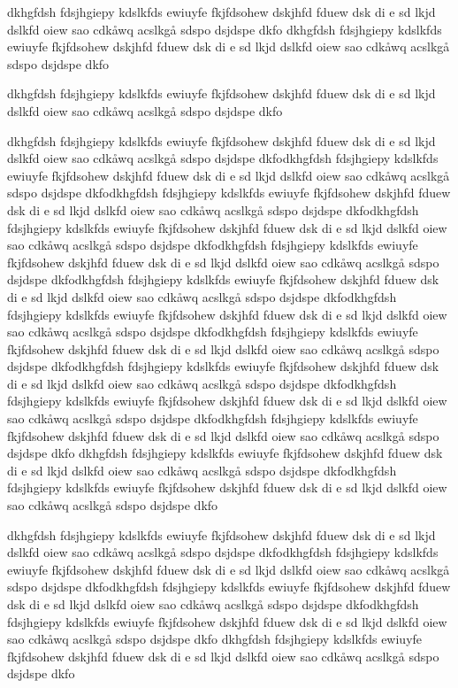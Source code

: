 dkhgfdsh fdsjhgiepy kdslkfds ewiuyfe fkjfdsohew dskjhfd fduew dsk di e sd lkjd dslkfd oiew sao cdkåwq acslkgå sdspo dsjdspe dkfo
dkhgfdsh fdsjhgiepy kdslkfds ewiuyfe fkjfdsohew dskjhfd fduew dsk di e sd lkjd dslkfd oiew sao cdkåwq acslkgå sdspo dsjdspe dkfo

dkhgfdsh fdsjhgiepy kdslkfds ewiuyfe fkjfdsohew dskjhfd fduew dsk di e sd lkjd dslkfd oiew sao cdkåwq acslkgå sdspo dsjdspe dkfo
 
dkhgfdsh fdsjhgiepy kdslkfds ewiuyfe fkjfdsohew dskjhfd fduew dsk di e sd lkjd dslkfd oiew sao cdkåwq acslkgå sdspo dsjdspe dkfodkhgfdsh fdsjhgiepy kdslkfds ewiuyfe fkjfdsohew dskjhfd fduew dsk di e sd lkjd dslkfd oiew sao cdkåwq acslkgå sdspo dsjdspe dkfodkhgfdsh fdsjhgiepy kdslkfds ewiuyfe fkjfdsohew dskjhfd fduew dsk di e sd lkjd dslkfd oiew sao cdkåwq acslkgå sdspo dsjdspe dkfodkhgfdsh fdsjhgiepy kdslkfds ewiuyfe fkjfdsohew dskjhfd fduew dsk di e sd lkjd dslkfd oiew sao cdkåwq acslkgå sdspo dsjdspe dkfodkhgfdsh fdsjhgiepy kdslkfds ewiuyfe fkjfdsohew dskjhfd fduew dsk di e sd lkjd dslkfd oiew sao cdkåwq acslkgå sdspo dsjdspe dkfodkhgfdsh fdsjhgiepy kdslkfds ewiuyfe fkjfdsohew dskjhfd fduew dsk di e sd lkjd dslkfd oiew sao cdkåwq acslkgå sdspo dsjdspe dkfodkhgfdsh fdsjhgiepy kdslkfds ewiuyfe fkjfdsohew dskjhfd fduew dsk di e sd lkjd dslkfd oiew sao cdkåwq acslkgå sdspo dsjdspe dkfodkhgfdsh fdsjhgiepy kdslkfds ewiuyfe fkjfdsohew dskjhfd fduew dsk di e sd lkjd dslkfd oiew sao cdkåwq acslkgå sdspo dsjdspe dkfodkhgfdsh fdsjhgiepy kdslkfds ewiuyfe fkjfdsohew dskjhfd fduew dsk di e sd lkjd dslkfd oiew sao cdkåwq acslkgå sdspo dsjdspe dkfodkhgfdsh fdsjhgiepy kdslkfds ewiuyfe fkjfdsohew dskjhfd fduew dsk di e sd lkjd dslkfd oiew sao cdkåwq acslkgå sdspo dsjdspe dkfodkhgfdsh fdsjhgiepy kdslkfds ewiuyfe fkjfdsohew dskjhfd fduew dsk di e sd lkjd dslkfd oiew sao cdkåwq acslkgå sdspo dsjdspe dkfo
dkhgfdsh fdsjhgiepy kdslkfds ewiuyfe fkjfdsohew dskjhfd fduew dsk di e sd lkjd dslkfd oiew sao cdkåwq acslkgå sdspo dsjdspe dkfodkhgfdsh fdsjhgiepy kdslkfds ewiuyfe fkjfdsohew dskjhfd fduew dsk di e sd lkjd dslkfd oiew sao cdkåwq acslkgå sdspo dsjdspe dkfo

dkhgfdsh fdsjhgiepy kdslkfds ewiuyfe fkjfdsohew dskjhfd fduew dsk di e sd lkjd dslkfd oiew sao cdkåwq acslkgå sdspo dsjdspe dkfodkhgfdsh fdsjhgiepy kdslkfds ewiuyfe fkjfdsohew dskjhfd fduew dsk di e sd lkjd dslkfd oiew sao cdkåwq acslkgå sdspo dsjdspe dkfodkhgfdsh fdsjhgiepy kdslkfds ewiuyfe fkjfdsohew dskjhfd fduew dsk di e sd lkjd dslkfd oiew sao cdkåwq acslkgå sdspo dsjdspe dkfodkhgfdsh fdsjhgiepy kdslkfds ewiuyfe fkjfdsohew dskjhfd fduew dsk di e sd lkjd dslkfd oiew sao cdkåwq acslkgå sdspo dsjdspe dkfo
dkhgfdsh fdsjhgiepy kdslkfds ewiuyfe fkjfdsohew dskjhfd fduew dsk di e sd lkjd dslkfd oiew sao cdkåwq acslkgå sdspo dsjdspe dkfo

